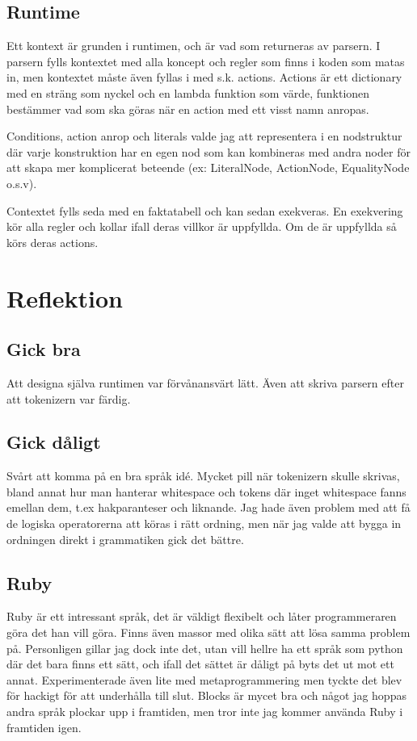 \documentclass{TDP005mall}
\begin{document}
\subsection{Runtime}
Ett kontext är grunden i runtimen, och är vad som returneras av parsern. I parsern fylls
kontextet med alla koncept och regler som finns i koden som matas in, men kontextet måste även fyllas
i med s.k. actions. Actions är ett dictionary med en sträng som nyckel och en lambda funktion som värde, funktionen
bestämmer vad som ska göras när en action med ett visst namn anropas.

Conditions, action anrop och literals valde jag att representera i en nodstruktur där
varje konstruktion har en egen nod som kan kombineras med andra noder för att skapa mer
komplicerat beteende (ex: LiteralNode, ActionNode, EqualityNode o.s.v).

Contextet fylls seda med en faktatabell och kan sedan exekveras. En exekvering kör alla regler och kollar ifall deras villkor är uppfyllda.
Om de är uppfyllda så körs deras actions.

\section{Reflektion}
\subsection{Gick bra}
Att designa själva runtimen var förvånansvärt lätt. Även att skriva parsern efter att
tokenizern var färdig.

\subsection{Gick dåligt}
Svårt att komma på en bra språk idé. Mycket pill när tokenizern skulle skrivas, bland annat
hur man hanterar whitespace och tokens där inget whitespace fanns emellan dem, t.ex hakparanteser och liknande.
Jag hade även problem med att få de logiska operatorerna att köras i rätt ordning, men när jag
valde att bygga in ordningen direkt i grammatiken gick det bättre.

\subsection{Ruby}
Ruby är ett intressant språk, det är väldigt flexibelt och låter programmeraren göra det han vill göra.
Finns även massor med olika sätt att lösa samma problem på. Personligen gillar jag dock inte det, utan
vill hellre ha ett språk som python där det bara finns ett sätt, och ifall det sättet är dåligt på byts det ut mot ett annat.
Experimenterade även lite med metaprogrammering men tyckte det blev för hackigt för att underhålla till slut.
Blocks är mycet bra och något jag hoppas andra språk plockar upp i framtiden, men tror inte jag kommer
använda Ruby i framtiden igen.
\end{document}
